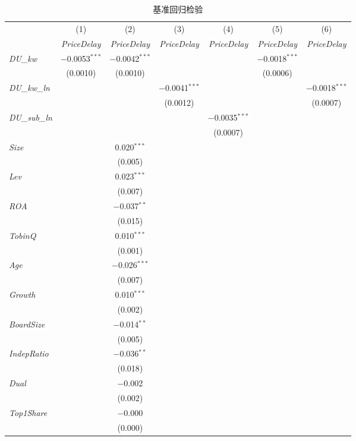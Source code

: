 \documentclass[11pt,a4paper]{article}
\begin{document}
\begin{table}[htbp]
\centering
\caption{基准回归检验}
\label{tab:baseline}
\small
\setlength{\tabcolsep}{5pt}
\begin{tabular}{l*{6}{c}}
\toprule
 & (1) & (2) & (3) & (4) & (5) & (6) \\
 & \textit{PriceDelay} & \textit{PriceDelay} & \textit{PriceDelay} & \textit{PriceDelay} & \textit{PriceDelay} & \textit{PriceDelay} \\
\midrule
\textit{DU\_kw}
 & $-$0.0053$^{***}$ & $-$0.0042$^{***}$ & & & $-$0.0018$^{***}$ & \\
 & (0.0010) & (0.0010) & & & (0.0006) & \\[4pt]
\textit{DU\_kw\_ln}
 & & & $-$0.0041$^{***}$ & & & $-$0.0018$^{***}$ \\
 & & & (0.0012) & & & (0.0007) \\[4pt]
\textit{DU\_sub\_ln}
 & & & & $-$0.0035$^{***}$ & & \\
 & & & & (0.0007) & & \\[4pt]
\textit{Size}
 & & 0.020$^{***}$ & & & & \\
 & & (0.005) & & & & \\[2pt]
\textit{Lev}
 & & 0.023$^{***}$ & & & & \\
 & & (0.007) & & & & \\[2pt]
\textit{ROA}
 & & $-$0.037$^{**}$ & & & & \\
 & & (0.015) & & & & \\[2pt]
\textit{TobinQ}
 & & 0.010$^{***}$ & & & & \\
 & & (0.001) & & & & \\[2pt]
\textit{Age}
 & & $-$0.026$^{***}$ & & & & \\
 & & (0.007) & & & & \\[2pt]
\textit{Growth}
 & & 0.010$^{***}$ & & & & \\
 & & (0.002) & & & & \\[2pt]
\textit{BoardSize}
 & & $-$0.014$^{**}$ & & & & \\
 & & (0.005) & & & & \\[2pt]
\textit{IndepRatio}
 & & $-$0.036$^{**}$ & & & & \\
 & & (0.018) & & & & \\[2pt]
\textit{Dual}
 & & $-$0.002 & & & & \\
 & & (0.002) & & & & \\[2pt]
\textit{Top1Share}
 & & $-$0.000 & & & & \\
 & & (0.000) & & & & \\[2pt]

\end{tabular}
\end{table}
\end{document}
